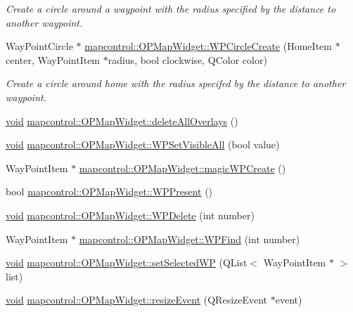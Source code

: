 \begin{DoxyCompactItemize}
\begin{DoxyCompactList}\small\item\em \-Create a circle around a waypoint with the radius specified by the distance to another waypoint. \end{DoxyCompactList}\item 
\-Way\-Point\-Circle $\ast$ \hyperlink{group___o_p_map_widget_gad8d5513836ce91c3ab5f84cf81ce2ec8}{mapcontrol\-::\-O\-P\-Map\-Widget\-::\-W\-P\-Circle\-Create} (\-Home\-Item $\ast$center, \-Way\-Point\-Item $\ast$radius, bool clockwise, \-Q\-Color color)
\begin{DoxyCompactList}\small\item\em \-Create a circle around home with the radius specifed by the distance to another waypoint. \end{DoxyCompactList}\item 
\hyperlink{group___u_a_v_objects_plugin_ga444cf2ff3f0ecbe028adce838d373f5c}{void} \hyperlink{group___o_p_map_widget_gaaad12163774b8b524d7d05ed28b01cae}{mapcontrol\-::\-O\-P\-Map\-Widget\-::delete\-All\-Overlays} ()
\item 
\hyperlink{group___u_a_v_objects_plugin_ga444cf2ff3f0ecbe028adce838d373f5c}{void} \hyperlink{group___o_p_map_widget_ga9a1f7cb8eb3ca498061257be74ed76c6}{mapcontrol\-::\-O\-P\-Map\-Widget\-::\-W\-P\-Set\-Visible\-All} (bool value)
\item 
\-Way\-Point\-Item $\ast$ \hyperlink{group___o_p_map_widget_gad4bf26f4b1c6f177513e61bd70956360}{mapcontrol\-::\-O\-P\-Map\-Widget\-::magic\-W\-P\-Create} ()
\item 
bool \hyperlink{group___o_p_map_widget_ga22fc188ce6991cc900182e1a60b3ee34}{mapcontrol\-::\-O\-P\-Map\-Widget\-::\-W\-P\-Present} ()
\item 
\hyperlink{group___u_a_v_objects_plugin_ga444cf2ff3f0ecbe028adce838d373f5c}{void} \hyperlink{group___o_p_map_widget_ga7bea26b184175ee4cf10a9103b59de32}{mapcontrol\-::\-O\-P\-Map\-Widget\-::\-W\-P\-Delete} (int number)
\item 
\-Way\-Point\-Item $\ast$ \hyperlink{group___o_p_map_widget_ga633b72f3ab012b8e9b8f6e58b75bfbb8}{mapcontrol\-::\-O\-P\-Map\-Widget\-::\-W\-P\-Find} (int number)
\item 
\hyperlink{group___u_a_v_objects_plugin_ga444cf2ff3f0ecbe028adce838d373f5c}{void} \hyperlink{group___o_p_map_widget_ga611fd47fbd108d887b40a1d1a878bd27}{mapcontrol\-::\-O\-P\-Map\-Widget\-::set\-Selected\-W\-P} (\-Q\-List$<$ \-Way\-Point\-Item $\ast$ $>$ list)
\item 
\hyperlink{group___u_a_v_objects_plugin_ga444cf2ff3f0ecbe028adce838d373f5c}{void} \hyperlink{group___o_p_map_widget_gaeb81f004806916633910751cfe808de8}{mapcontrol\-::\-O\-P\-Map\-Widget\-::resize\-Event} (\-Q\-Resize\-Event $\ast$event)

\end{DoxyCompactItemize}
